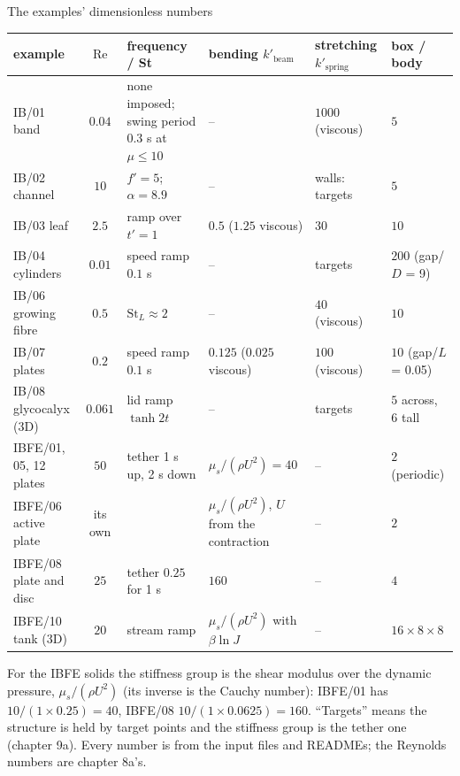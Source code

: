 \documentclass[aspectratio=169,11pt]{beamer}
\begin{document}
\begin{frame}{The examples' dimensionless numbers}
\label{fr:extable}
\tiny
\setlength{\tabcolsep}{3pt}
\begin{tabular}{@{}L{0.17\textwidth}cL{0.17\textwidth}L{0.2\textwidth}L{0.14\textwidth}L{0.14\textwidth}@{}}
\toprule
example & $\mathrm{Re}$ & frequency / St & bending $k'_{\mathrm{beam}}$ & stretching $k'_{\mathrm{spring}}$ & box / body\\
\midrule
IB/01 band & $0.04$ & none imposed; swing period $0.3$ s at $\mu \le 10$ & -- & $1000$ (viscous) & $5$\\
IB/02 channel & $10$ & $f' = 5$; $\alpha = 8.9$ & -- & walls: targets & $5$\\
IB/03 leaf & $2.5$ & ramp over $t' = 1$ & $0.5$ ($1.25$ viscous) & $30$ & $10$\\
IB/04 cylinders & $0.01$ & speed ramp $0.1$ s & -- & targets & $200$ (gap/$D$ = 9)\\
IB/06 growing fibre & $0.5$ & $\mathrm{St}_L \approx 2$ & -- & $40$ (viscous) & $10$\\
IB/07 plates & $0.2$ & speed ramp $0.1$ s & $0.125$ ($0.025$ viscous) & $100$ (viscous) & $10$ (gap/$L$ = 0.05)\\
IB/08 glycocalyx (3D) & $0.061$ & lid ramp $\tanh 2t$ & -- & targets & $5$ across, $6$ tall\\
IBFE/01, 05, 12 plates & $50$ & tether 1 s up, 2 s down & $\mu_s/(\rho U^2) = 40$ & -- & $2$ (periodic)\\
IBFE/06 active plate & its own &  & $\mu_s/(\rho U^2)$, $U$ from the contraction & -- & $2$\\
IBFE/08 plate and disc & $25$ & tether $0.25$ for 1 s & $160$ & -- & $4$\\
IBFE/10 tank (3D) & $20$ & stream ramp & $\mu_s/(\rho U^2)$ with $\beta\ln J$ & -- & $16 \times 8 \times 8$\\
\bottomrule
\end{tabular}

\footnotesize For the IBFE solids the stiffness group is the shear modulus over the dynamic pressure, $\mu_s/(\rho U^2)$ (its inverse is the Cauchy number): IBFE/01 has $10/(1\times0.25) = 40$, IBFE/08 $10/(1\times0.0625) = 160$. ``Targets'' means the structure is held by target points and the stiffness group is the tether one (chapter 9a). Every number is from the input files and READMEs; the Reynolds numbers are chapter 8a's.
\end{frame}
\end{document}
